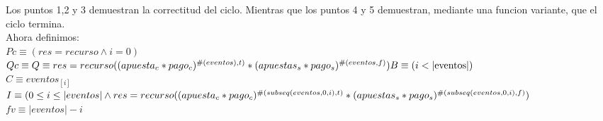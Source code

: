 \documentclass[10pt,a4paper]{article}
\begin{document}
Los puntos 1,2 y 3 demuestran la correctitud del ciclo. Mientras que los puntos 4 y 5 demuestran, mediante una funcion variante, que el ciclo termina. \\
Ahora definimos: \\
$Pc \equiv (res = recurso \wedge i = 0)$ \\
$Qc \equiv Q \equiv res = recurso((apuesta_c * pago_c)^{\#(eventos), t)} * (apuestas_s * pago_s)^{\#(eventos, f)})\\
B \equiv (i < |\text{eventos}|)$ \\
$C \equiv eventos_{[i]}$ \\
$I \equiv (0 \leq i \leq |eventos| \wedge \\ res = recurso((apuesta_c * pago_c)^{\#(subseq(eventos,0,i), t)} * (apuestas_s * pago_s)^{\#(subseq(eventos,0,i), f)})$ \\
${fv \equiv |eventos| - i}$ \\
\end{document}
